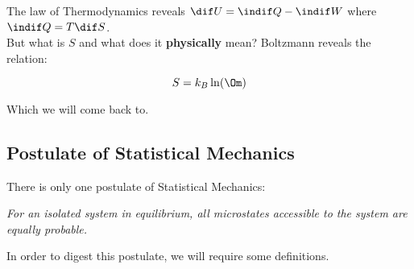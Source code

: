 \documentclass{article}
\begin{document}
The  law of Thermodynamics reveals $\dif U = \indif Q - \indif W$ where $\indif Q = T \dif S$. \\

But what is $S$ and what does it \textbf{physically} mean? Boltzmann reveals the relation:

\[ S = k_B \ln (\Om) \]

Which we will come back to.

\subsection{Postulate of Statistical Mechanics}

There is only one postulate of Statistical Mechanics:
\begin{displayquote}
    \textit{For an isolated system in equilibrium, all microstates accessible to the system are equally probable.}
\end{displayquote}

In order to digest this postulate, we will require some definitions.

\end{document}
